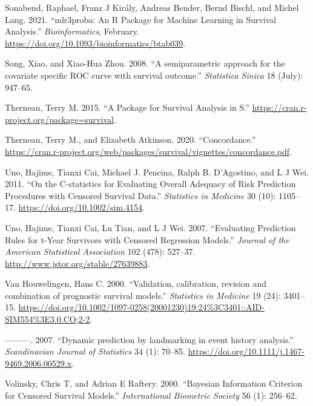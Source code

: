 \documentclass[
  letterpaper,
]{scrbook}
\newlength{\cslhangindent}
\newlength{\cslentryspacingunit} %
\newenvironment{CSLReferences}[2] %
 {%
  \setlength{\parindent}{0pt}
  \ifodd #1
  \let\oldpar\par
  \def\par{\hangindent=\cslhangindent\oldpar}
  \fi
  \setlength{\parskip}{#2\cslentryspacingunit}
 }%
 {}
\theoremstyle{plain}
\theoremstyle{definition}
\theoremstyle{remark}
\begin{document}
\begin{CSLReferences}{1}{0}
\leavevmode{}%
Sonabend, Raphael, Franz J Király, Andreas Bender, Bernd Bischl, and
Michel Lang. 2021. {``{mlr3proba: An R Package for Machine Learning in
Survival Analysis}.''} \emph{Bioinformatics}, February.
\url{https://doi.org/10.1093/bioinformatics/btab039}.

\leavevmode{}%
Song, Xiao, and Xiao-Hua Zhou. 2008. {``{A semiparametric approach for
the covariate specific ROC curve with survival outcome}.''}
\emph{Statistica Sinica} 18 (July): 947--65.

\leavevmode{}%
Therneau, Terry M. 2015. {``{A Package for Survival Analysis in S}.''}
\url{https://cran.r-project.org/package=survival}.

\leavevmode{}%
Therneau, Terry M., and Elizabeth Atkinson. 2020. {``{Concordance}.''}
\url{https://cran.r-project.org/web/packages/survival/vignettes/concordance.pdf}.

\leavevmode{}%
Uno, Hajime, Tianxi Cai, Michael J. Pencina, Ralph B. D'Agostino, and L
J Wei. 2011. {``{On the C-statistics for Evaluating Overall Adequacy of
Risk Prediction Procedures with Censored Survival Data}.''}
\emph{Statistics in Medicine} 30 (10): 1105--17.
\url{https://doi.org/10.1002/sim.4154}.

\leavevmode{}%
Uno, Hajime, Tianxi Cai, Lu Tian, and L J Wei. 2007. {``{Evaluating
Prediction Rules for t-Year Survivors with Censored Regression
Models}.''} \emph{Journal of the American Statistical Association} 102
(478): 527--37. \url{http://www.jstor.org/stable/27639883}.

\leavevmode{}%
Van Houwelingen, Hans C. 2000. {``{Validation, calibration, revision and
combination of prognostic survival models}.''} \emph{Statistics in
Medicine} 19 (24): 3401--15.
\url{https://doi.org/10.1002/1097-0258(20001230)19:24\%3C3401::AID-SIM554\%3E3.0.CO;2-2}.

\leavevmode{}%
---------. 2007. {``{Dynamic prediction by landmarking in event history
analysis}.''} \emph{Scandinavian Journal of Statistics} 34 (1): 70--85.
\url{https://doi.org/10.1111/j.1467-9469.2006.00529.x}.

\leavevmode{}%
Volinsky, Chris T, and Adrian E Raftery. 2000. {``{Bayesian Information
Criterion for Censored Survival Models}.''} \emph{International
Biometric Society} 56 (1): 256--62.


\end{CSLReferences}
\end{document}
